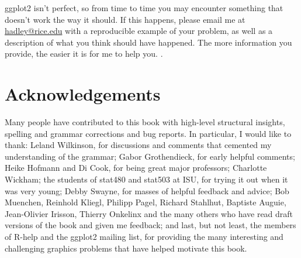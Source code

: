 ggplot2 isn't perfect, so from time to time you may encounter something that doesn't work the way it should.  If this happens, please email me at \href{mailto:hadley@rice.edu}{hadley@rice.edu} with a reproducible example of your problem, as well as a description of what you think should have happened.  The more information you provide, the easier it is for me to help you. .

\section{Acknowledgements}\label{sec:acknolwedgements}

Many people have contributed to this book with high-level structural insights, spelling and grammar corrections and bug reports.  In particular, I would like to thank: Leland Wilkinson, for discussions and comments that cemented my understanding of the grammar; Gabor Grothendieck, for early helpful comments; Heike Hofmann and Di Cook, for being great major professors; Charlotte Wickham; the students of stat480 and stat503 at ISU, for trying it out when it was very young; Debby Swayne, for masses of helpful feedback and advice; Bob Muenchen, Reinhold Kliegl, Philipp Pagel, Richard Stahlhut, Baptiste Auguie, Jean-Olivier Irisson, Thierry Onkelinx and the many others who have read draft versions of the book and given me feedback; and last, but not least, the members of R-help and the ggplot2 mailing list, for providing the many interesting and challenging graphics problems that have helped motivate this book.


